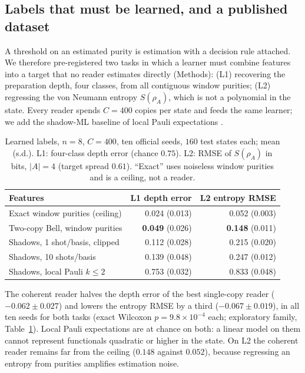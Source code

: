 \documentclass[11pt,a4paper]{article}
\begin{document}
\subsection{Labels that must be learned, and a published dataset}

A threshold on an estimated purity is estimation with a decision rule attached. We therefore
pre-registered two tasks in which a learner must combine features into a target that no reader
estimates directly (Methods): (L1) recovering the preparation depth, four classes, from all
contiguous window purities; (L2) regressing the von Neumann entropy $S(\rho_A)$, which is not a
polynomial in the state. Every reader spends $C=400$ copies per state and feeds the same learner;
we add the shadow-ML baseline of local Pauli expectations \citep{huang2021provably}.

\begin{table}[H]
\centering
\small
\caption{Learned labels, $n=8$, $C=400$, ten official seeds, $160$ test states each; mean (s.d.).
L1: four-class depth error (chance $0.75$). L2: RMSE of $S(\rho_A)$ in bits, $|A|=4$ (target spread
$0.61$). ``Exact'' uses noiseless window purities and is a ceiling, not a reader.}
\label{tab:learn}
\begin{tabular}{lrr}
\toprule
Features & L1 depth error & L2 entropy RMSE \\
\midrule
Exact window purities (ceiling) & 0.024 (0.013) & 0.052 (0.003) \\
Two-copy Bell, window purities & \textbf{0.049} (0.026) & \textbf{0.148} (0.011) \\
Shadows, 1 shot/basis, clipped & 0.112 (0.028) & 0.215 (0.020) \\
Shadows, 10 shots/basis & 0.139 (0.048) & 0.247 (0.012) \\
Shadows, local Pauli $k\le2$ & 0.753 (0.032) & 0.833 (0.048) \\
\bottomrule
\end{tabular}
\end{table}

The coherent reader halves the depth error of the best single-copy reader ($-0.062\pm0.027$) and
lowers the entropy RMSE by a third ($-0.067\pm0.019$), in all ten seeds for both tasks (exact
Wilcoxon $p=9.8\times10^{-4}$ each; exploratory family, Table~\ref{tab:learn}). Local Pauli
expectations are at chance on both: a linear model on them cannot represent functionals quadratic
or higher in the state. On L2 the coherent reader remains far from the ceiling ($0.148$ against
$0.052$), because regressing an entropy from purities amplifies estimation noise.
\end{document}
